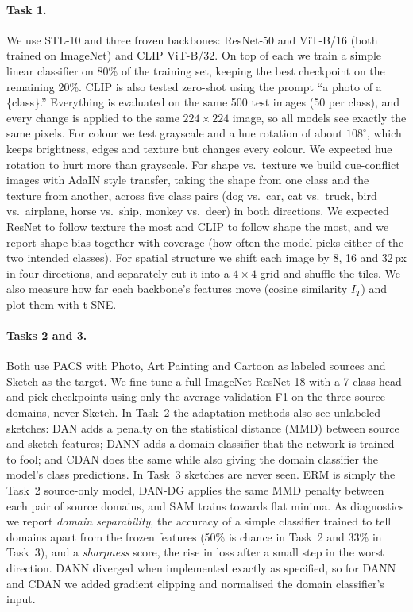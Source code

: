 \documentclass{article}
\begin{document}
\paragraph{Task 1.} We use STL-10 and three frozen backbones: ResNet-50 and ViT-B/16 (both trained on ImageNet) and CLIP ViT-B/32. On top of each we train a simple linear classifier on 80\% of the training set, keeping the best checkpoint on the remaining 20\%. CLIP is also tested zero-shot using the prompt ``a photo of a \{class\}.'' Everything is evaluated on the same 500 test images (50 per class), and every change is applied to the same $224{\times}224$ image, so all models see exactly the same pixels. For colour we test grayscale and a hue rotation of about $108^\circ$, which keeps brightness, edges and texture but changes every colour. We expected hue rotation to hurt more than grayscale. For shape vs.\ texture we build cue-conflict images with AdaIN style transfer, taking the shape from one class and the texture from another, across five class pairs (dog vs.\ car, cat vs.\ truck, bird vs.\ airplane, horse vs.\ ship, monkey vs.\ deer) in both directions. We expected ResNet to follow texture the most and CLIP to follow shape the most, and we report shape bias together with coverage (how often the model picks either of the two intended classes). For spatial structure we shift each image by 8, 16 and 32\,px in four directions, and separately cut it into a $4{\times}4$ grid and shuffle the tiles. We also measure how far each backbone's features move (cosine similarity $I_T$) and plot them with t-SNE.

\paragraph{Tasks 2 and 3.} Both use PACS with Photo, Art Painting and Cartoon as labeled sources and Sketch as the target. We fine-tune a full ImageNet ResNet-18 with a 7-class head and pick checkpoints using only the average validation F1 on the three source domains, never Sketch. In Task~2 the adaptation methods also see unlabeled sketches: DAN adds a penalty on the statistical distance (MMD) between source and sketch features; DANN adds a domain classifier that the network is trained to fool; and CDAN does the same while also giving the domain classifier the model's class predictions. In Task~3 sketches are never seen. ERM is simply the Task~2 source-only model, DAN-DG applies the same MMD penalty between each pair of source domains, and SAM trains towards flat minima. As diagnostics we report \emph{domain separability}, the accuracy of a simple classifier trained to tell domains apart from the frozen features (50\% is chance in Task~2 and 33\% in Task~3), and a \emph{sharpness} score, the rise in loss after a small step in the worst direction. DANN diverged when implemented exactly as specified, so for DANN and CDAN we added gradient clipping and normalised the domain classifier's input.
\end{document}
